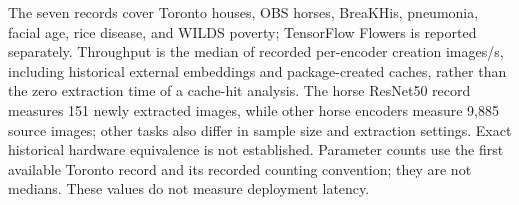 The seven records cover Toronto houses, OBS horses, BreaKHis, pneumonia, facial age, rice disease, and WILDS poverty; TensorFlow Flowers is reported separately. Throughput is the median of recorded per-encoder creation images/s, including historical external embeddings and package-created caches, rather than the zero extraction time of a cache-hit analysis. The horse ResNet50 record measures 151 newly extracted images, while other horse encoders measure 9,885 source images; other tasks also differ in sample size and extraction settings. Exact historical hardware equivalence is not established. Parameter counts use the first available Toronto record and its recorded counting convention; they are not medians. These values do not measure deployment latency.
